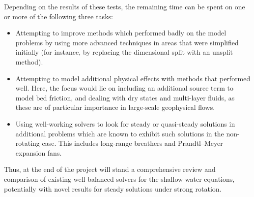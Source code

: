 \documentclass[a4paper,onecolumn,11pt]{article}
\begin{document}
Depending on the results of these tests, the remaining time can be spent on one or more of the following three tasks:

\begin{itemize}
    \item Attempting to improve methods which performed badly on the model problems by using more advanced techniques in areas that were simplified initially (for instance, by replacing the dimensional split with an unsplit method).
    \item Attempting to model additional physical effects with methods that performed well. Here, the focus would lie on including an additional source term to model bed friction, and dealing with dry states and multi-layer fluids, as these are of particular importance in large-scale geophysical flows.
    \item Using well-working solvers to look for steady or quasi-steady solutions in additional problems which are known to exhibit such solutions in the non-rotating case. This includes long-range breathers and Prandtl--Meyer expansion fans.
\end{itemize}

Thus, at the end of the project will stand a comprehensive review and comparison of existing well-balanced solvers for the shallow water equations, potentially with novel results for steady solutions under strong rotation.



\end{document}
